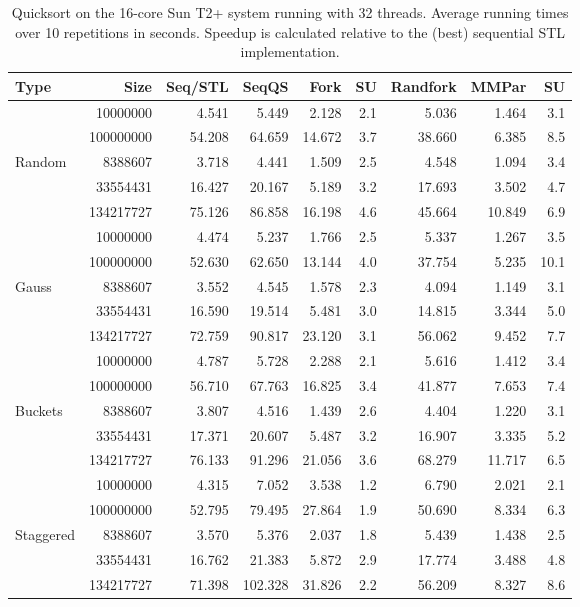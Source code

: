 \documentclass[preprint]{sigplanconf}
\begin{document}
\begin{table*}[t!]
\begin{center}
\begin{tabular}{|lr|rr|rrr||rr|}
\hline
Type & Size & Seq/STL & SeqQS & Fork & SU & Randfork & MMPar & SU \\
\hline
 & 10000000 & 4.541 & 5.449 & 2.128 & 2.1 & 5.036 & 1.464 & 3.1 \\
 & 100000000 & 54.208 & 64.659 & 14.672 & 3.7 & 38.660 & 6.385 & 8.5 \\
Random & 8388607 & 3.718 & 4.441 & 1.509 & 2.5 & 4.548 & 1.094 & 3.4 \\
 & 33554431 & 16.427 & 20.167 & 5.189 & 3.2 & 17.693 & 3.502 & 4.7 \\
 & 134217727 & 75.126 & 86.858 & 16.198 & 4.6 & 45.664 & 10.849 & 6.9 \\
\hline
 & 10000000 & 4.474 & 5.237 & 1.766 & 2.5 & 5.337 & 1.267 & 3.5 \\
 & 100000000 & 52.630 & 62.650 & 13.144 & 4.0 & 37.754 & 5.235 & 10.1 \\
Gauss & 8388607 & 3.552 & 4.545 & 1.578 & 2.3 & 4.094 & 1.149 & 3.1 \\
 & 33554431 & 16.590 & 19.514 & 5.481 & 3.0 & 14.815 & 3.344 & 5.0 \\
 & 134217727 & 72.759 & 90.817 & 23.120 & 3.1 & 56.062 & 9.452 & 7.7 \\
\hline
 & 10000000 & 4.787 & 5.728 & 2.288 & 2.1 & 5.616 & 1.412 & 3.4 \\
 & 100000000 & 56.710 & 67.763 & 16.825 & 3.4 & 41.877 & 7.653 & 7.4 \\
Buckets & 8388607 & 3.807 & 4.516 & 1.439 & 2.6 & 4.404 & 1.220 & 3.1 \\
 & 33554431 & 17.371 & 20.607 & 5.487 & 3.2 & 16.907 & 3.335 & 5.2 \\
 & 134217727 & 76.133 & 91.296 & 21.056 & 3.6 & 68.279 & 11.717 & 6.5 \\
\hline
 & 10000000 & 4.315 & 7.052 & 3.538 & 1.2 & 6.790 & 2.021 & 2.1 \\
 & 100000000 & 52.795 & 79.495 & 27.864 & 1.9 & 50.690 & 8.334 & 6.3 \\
Staggered & 8388607 & 3.570 & 5.376 & 2.037 & 1.8 & 5.439 & 1.438 & 2.5 \\
 & 33554431 & 16.762 & 21.383 & 5.872 & 2.9 & 17.774 & 3.488 & 4.8 \\
 & 134217727 & 71.398 & 102.328 & 31.826 & 2.2 & 56.209 & 8.327 & 8.6 \\
\hline
\end{tabular}
\end{center}
\caption{Quicksort on the 16-core Sun T2+ system running with 32 threads. 
Average running times over 10 repetitions in seconds.
Speedup is calculated relative to the (best) sequential STL implementation.}
\label{tab:sort_t2_32_avg}
\end{table*}
\end{document}
